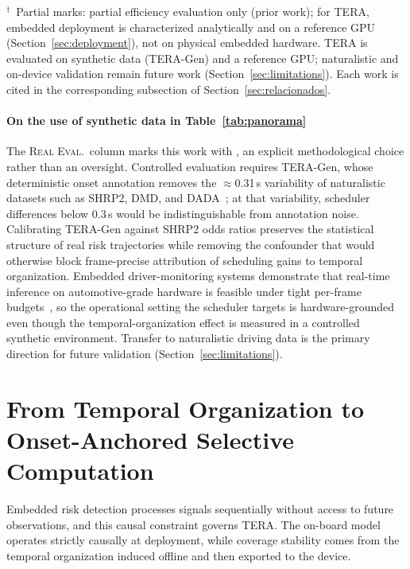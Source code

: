 \documentclass[a4paper,fleqn]{cas-dc}
\newcommand{\TERAGen}{\mbox{TERA-Gen}\xspace}
\begin{document}
\begin{table}
\vspace{2pt}
\par\scriptsize
$^\dagger$~Partial marks: partial efficiency evaluation only (prior work); for TERA, embedded deployment is characterized analytically and on a reference GPU (Section~\ref{sec:deployment}), not on physical embedded hardware. TERA is evaluated on synthetic
data (\mbox{TERA-Gen}) and a reference GPU; naturalistic and on-device validation
remain future work (Section~\ref{sec:limitations}). Each work is cited in the
corresponding subsection of Section~\ref{sec:relacionados}.
\end{table}
\paragraph{On the use of synthetic data in Table~\ref{tab:panorama}}
The \textsc{Real Eval.}\ column marks this work with , an explicit
methodological choice rather than an oversight. Controlled evaluation requires
\TERAGen, whose deterministic onset annotation removes the $\approx$0.31\,s
variability of naturalistic datasets such as SHRP2, DMD, and
DADA~\cite{dingus2016shrp2,ortega2020dmd,fang2022dada}; at that variability,
scheduler differences below 0.3\,s would be indistinguishable from annotation
noise. Calibrating \TERAGen against SHRP2 odds ratios preserves the statistical
structure of real risk trajectories while removing the confounder that would
otherwise block frame-precise attribution of scheduling gains to temporal
organization. Embedded driver-monitoring systems demonstrate that real-time
inference on automotive-grade hardware is feasible under tight per-frame
budgets~\cite{hariharan2023driveredge,tinydl2025driverstate}, so the
operational setting the scheduler targets is hardware-grounded even though the
temporal-organization effect is measured in a controlled synthetic environment.
Transfer to naturalistic driving data is the
primary direction for future validation (Section~\ref{sec:limitations}).
\section{From Temporal Organization to Onset-Anchored Selective Computation}
\label{sec:framework}
Embedded risk detection processes signals sequentially without access to future
observations, and this causal constraint governs TERA. The on-board model
operates strictly causally at deployment, while coverage stability comes from
the temporal organization induced offline and then exported to the device.
\end{document}
